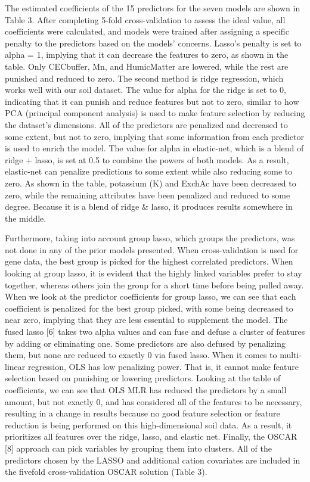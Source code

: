 \documentclass{article} %
\begin{document}
\noindent The estimated coefficients of the 15 predictors for the seven models are shown in Table 3. After completing 5-fold cross-validation to assess the ideal value, all coefficients were calculated, and models were trained after assigning a specific penalty to the predictors based on the models' concerns. Lasso's penalty is set to alpha = 1, implying that it can decrease the features to zero, as shown in the table. Only CECbuffer, Mn, and HumicMatter are lowered, while the rest are punished and reduced to zero. The second method is ridge regression, which works well with our soil dataset. The value for alpha for the ridge is set to 0, indicating that it can punish and reduce features but not to zero, similar to how PCA (principal component analysis) is used to make feature selection by reducing the dataset's dimensions. All of the predictors are penalized and decreased to some extent, but not to zero, implying that some information from each predictor is used to enrich the model. The value for alpha in elastic-net, which is a blend of ridge + lasso, is set at 0.5 to combine the powers of both models. As a result, elastic-net can penalize predictions to some extent while also reducing some to zero. As shown in the table, potassium (K) and ExchAc have been decreased to zero, while the remaining attributes have been penalized and reduced to some degree. Because it is a blend of ridge \& lasso, it produces results somewhere in the middle.

\noindent Furthermore, taking into account group lasso, which groups the predictors, was not done in any of the prior models presented. When cross-validation is used for gene data, the best group is picked for the highest correlated predictors. When looking at group lasso, it is evident that the highly linked variables prefer to stay together, whereas others join the group for a short time before being pulled away. When we look at the predictor coefficients for group lasso, we can see that each coefficient is penalized for the best group picked, with some being decreased to near zero, implying that they are less essential to supplement the model. The fused lasso [6] takes two alpha values and can fuse and defuse a cluster of features by adding or eliminating one. Some predictors are also defused by penalizing them, but none are reduced to exactly 0 via fused lasso. When it comes to multi-linear regression, OLS has low penalizing power. That is, it cannot make feature selection based on punishing or lowering predictors. Looking at the table of coefficients, we can see that OLS MLR has reduced the predictors by a small amount, but not exactly 0, and has considered all of the features to be necessary, resulting in a change in results because no good feature selection or feature reduction is being performed on this high-dimensional soil data. As a result, it prioritizes all features over the ridge, lasso, and elastic net. Finally, the OSCAR [8] approach can pick variables by grouping them into clusters. All of the predictors chosen by the LASSO and additional cation covariates are included in the fivefold cross-validation OSCAR solution (Table 3). 
\end{document}
